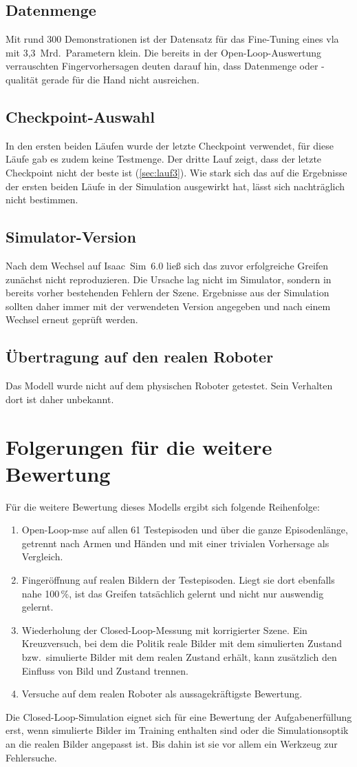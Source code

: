 \subsection{Datenmenge}
Mit rund 300 Demonstrationen ist der Datensatz für das Fine-Tuning eines
\ac{vla} mit 3,3~Mrd.\ Parametern klein. Die bereits in der Open-Loop-Auswertung
verrauschten Fingervorhersagen deuten darauf hin, dass Datenmenge oder
-qualität gerade für die Hand nicht ausreichen.

\subsection{Checkpoint-Auswahl}
In den ersten beiden Läufen wurde der letzte Checkpoint verwendet, für diese
Läufe gab es zudem keine Testmenge. Der dritte Lauf zeigt, dass der letzte
Checkpoint nicht der beste ist (\cref{sec:lauf3}). Wie stark sich das auf die
Ergebnisse der ersten beiden Läufe in der Simulation ausgewirkt hat, lässt
sich nachträglich nicht bestimmen.

\subsection{Simulator-Version}
Nach dem Wechsel auf Isaac~Sim~6.0 ließ sich das zuvor erfolgreiche
Greifen zunächst nicht reproduzieren. Die Ursache lag nicht im Simulator,
sondern in bereits vorher bestehenden Fehlern der Szene. Ergebnisse aus der
Simulation sollten daher immer mit der verwendeten Version angegeben und nach
einem Wechsel erneut geprüft werden.

\subsection{Übertragung auf den realen Roboter}
Das Modell wurde nicht auf dem physischen Roboter getestet. Sein Verhalten
dort ist daher unbekannt.

\section{Folgerungen für die weitere Bewertung}
\label{sec:konsequenz}

Für die weitere Bewertung dieses Modells ergibt sich folgende Reihenfolge:

\begin{enumerate}
  \item Open-Loop-\ac{mse} auf allen 61 Testepisoden und über die ganze
    Episodenlänge, getrennt nach Armen und Händen und mit einer trivialen
    Vorhersage als Vergleich.
  \item Fingeröffnung auf realen Bildern der Testepisoden. Liegt sie dort
    ebenfalls nahe 100\,\%, ist das Greifen tatsächlich gelernt und nicht nur
    auswendig gelernt.
  \item Wiederholung der Closed-Loop-Messung mit korrigierter Szene. Ein
    Kreuzversuch, bei dem die Politik reale Bilder mit dem simulierten Zustand
    bzw.\ simulierte Bilder mit dem realen Zustand erhält, kann zusätzlich den
    Einfluss von Bild und Zustand trennen.
  \item Versuche auf dem realen Roboter als aussagekräftigste Bewertung.
\end{enumerate}

Die Closed-Loop-Simulation eignet sich für eine Bewertung der
Aufgabenerfüllung erst, wenn simulierte Bilder im Training enthalten sind oder
die Simulationsoptik an die realen Bilder angepasst ist. Bis dahin ist sie vor
allem ein Werkzeug zur Fehlersuche.
